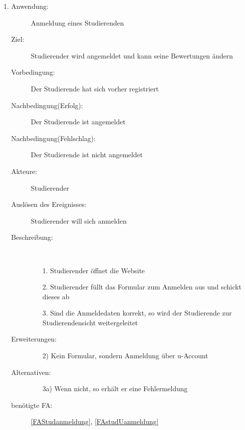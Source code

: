 \documentclass[parskip=full]{scrartcl}
\newcommand{\swtLabel}[1]{\textbf{/#1\arabic*0/}}
\begin{document}
\begin{enumerate}[label=\swtLabel{S}]
  \item
    \begin{description}
    \item[Anwendung:] Anmeldung eines Studierenden
    \item[Ziel:] Studierender wird angemeldet und kann seine Bewertungen ändern
  	\item[Vorbedingung:] Der Studierende hat sich vorher registriert
  	\item[Nachbedingung(Erfolg):] Der Studierende ist angemeldet
  	\item[Nachbedingung(Fehlschlag):] Der Studierende ist nicht angemeldet
  	\item[Akteure:] Studierender
  	\item[Auslösen des Ereignisses:] Studierender will sich anmelden
  	\item[Beschreibung:]~
  	\begin{enumerate}
  	  \item[1.] Studierender öffnet die Website
  	  \item[2.] Studierender füllt das Formular zum Anmelden aus und schickt
  	  dieses ab %
  	  \item[3.] Sind die Anmeldedaten korrekt, so wird der Studierende zur
  	  Studierendensicht weitergeleitet
  	\end{enumerate}
  	\item[Erweiterungen:]
  	\begin{enumerate}
  	  \item[2)] Kein Formular, sondern Anmeldung über u-Account
  	\end{enumerate}    	
  	\item[Alternativen:]
	\begin{enumerate}
  	  \item[3a)] Wenn nicht, so erhält er eine Fehlermeldung
  	\end{enumerate}
  	\item[benötigte FA:] \ref{FAStudanmeldung}, \ref{FAstudUanmeldung}
  \end{description}
   

\end{enumerate}
\end{document}
